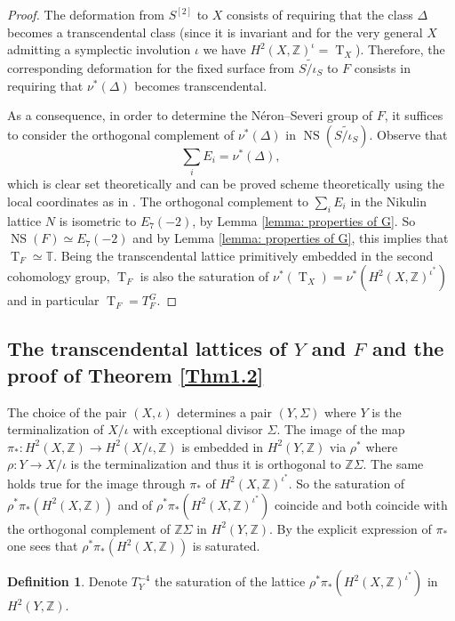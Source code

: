 \documentclass{amsart}
\theoremstyle{definition}
\newtheorem{defi}[thm]{Definition}
\numberwithin{equation}{section}
\numberwithin{equation}{section} \theoremstyle{definition}
\DeclareMathOperator{\NS}{NS}
\DeclareMathOperator{\T}{T}
\newcommand{\ra}{\rightarrow}
\newcommand\Z{\mathbb{Z}}
\begin{document}
\begin{proof}
The deformation from $S^{[2]}$ to $X$ consists of requiring that the class $\Delta$ becomes a transcendental class (since it is invariant and for the very general $X$ admitting a symplectic involution $\iota$ we have $H^2(X,\Z)^{\iota}=\T_X$). Therefore, the corresponding deformation for the fixed surface from $\widetilde{S/\iota_S}$ to $F$ consists in requiring that $\nu^*(\Delta)$ becomes transcendental.

As a consequence, in order to determine the N\'eron--Severi group of $F$, it suffices to consider the orthogonal complement of  
$\nu^*(\Delta)$ in $\NS(\widetilde{S/\iota_S})$.
Observe that $$\sum_iE_i=\nu^* (\Delta),$$ which is clear set theoretically and can be proved scheme theoretically using the local coordinates as in \cite[Example 4.5 a)]{F}.
The orthogonal complement to $\sum_iE_i$ in the Nikulin lattice $N$ is isometric to $E_7(-2)$, by Lemma \ref{lemma: properties of G}. So $\NS(F)\simeq E_7(-2)$ and by Lemma \ref{lemma: properties of G}, this implies that $\T_F\simeq \mathbb{T}$. Being the transcendental lattice primitively embedded in the second cohomology group, $\T_F$ is also the saturation of $\nu^*(\T_X)=\nu^*(H^2(X,\Z)^{\iota^*})$ and in particular $\T_F=T_F^G$.
\end{proof}

\subsection{The transcendental lattices of $Y$ and $F$ and the proof of Theorem \ref{Thm1.2}}



The choice of the pair $(X,\iota)$ determines a pair $(Y,\Sigma)$ where $Y$ is the terminalization of $X/\iota$ with exceptional divisor $\Sigma$. The  image of the map $\pi_*:H^2(X,\Z)\ra H^2(X/\iota,\Z)$ is embedded in $H^2(Y,\Z)$ via $\rho^*$ where $\rho:Y\ra X/\iota$ is the terminalization and thus it is orthogonal to $\Z\Sigma$. The same holds true for the image through $\pi_*$ of $H^2(X,\Z)^{\iota^*}$. So the saturation of $\rho^*\pi_*(H^2(X,\Z))$ and of $\rho^*\pi_*(H^2(X,\Z)^{\iota^*})$ coincide and both coincide with the orthogonal complement of $\Z\Sigma$ in $H^2(Y,\Z)$. By the explicit expression of $\pi_*$ one sees that $\rho^*\pi_*(H^2(X,\Z))$ is saturated.

\begin{defi} Denote 
$T_Y^{-4}$ the saturation of the lattice $\rho^*\pi_*(H^2(X,\mathbb Z)^{\iota^*})$ in $H^2(Y,\mathbb{Z})$.\end{defi}
\end{document}

